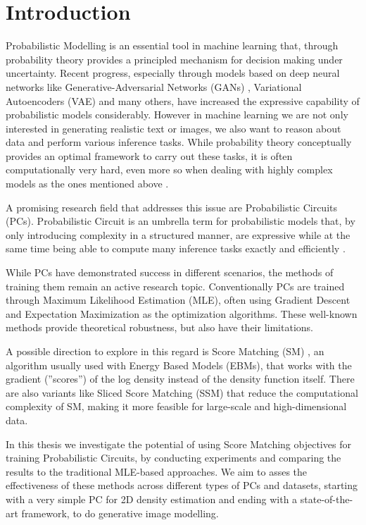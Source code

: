 \chapter{Introduction}
\label{cha:introduction}


Probabilistic Modelling is an essential tool in machine learning that, through probability theory provides a 
principled mechanism for decision making under uncertainty. Recent progress, especially through models based on deep neural networks like Generative-Adversarial
Networks (GANs) \cite{gan}, Variational Autoencoders (VAE) \cite{vae} and many others, have increased the expressive capability of probabilistic models considerably. 
However in machine learning we are not only interested in generating realistic text or images, 
we also want to reason about data and perform various inference tasks. While probability theory conceptually provides 
an optimal framework to carry out these tasks, it is often computationally very hard, even more so when dealing 
with highly complex models as the ones mentioned above \cite{pc_intro}.

A promising research field that addresses this issue are Probabilistic Circuits (PCs). Probabilistic 
Circuit is an umbrella term for probabilistic models that, by only introducing 
complexity in a structured manner, are expressive while at the same time 
being able to compute many inference tasks exactly and efficiently \cite{pc_intro}.

While PCs have demonstrated success in different scenarios, the methods of training them remain 
an active research topic. Conventionally PCs are trained through Maximum Likelihood Estimation (MLE), often 
using Gradient Descent and Expectation Maximization as the optimization algorithms. These well-known methods
provide theoretical robustness, but also have their limitations.

A possible direction to explore in this regard is Score Matching (SM) \cite{sm}, an algorithm usually used 
with Energy Based Models (EBMs), that works with the gradient (''scores'') of the log density instead 
of the density function itself. There are also variants like Sliced Score Matching (SSM) \cite{ssm} that reduce
the computational complexity of SM, making it more feasible for large-scale and high-dimensional data. 

In this thesis we investigate the potential of using Score Matching objectives for training Probabilistic Circuits,
by conducting experiments and comparing the results to the traditional MLE-based approaches. 
We aim to asses the effectiveness of these methods across different types of PCs and datasets, starting with 
a very simple PC for 2D density estimation and ending with a state-of-the-art framework, to do generative image modelling. 